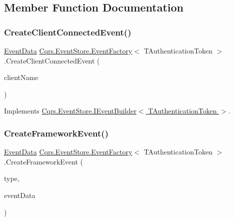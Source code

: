 \subsection{Member Function Documentation}
\mbox{\label{classCqrs_1_1EventStore_1_1EventFactory_a237daf998b545d170ab9f30187a0b8e7_a237daf998b545d170ab9f30187a0b8e7}} 
\subsubsection{\texorpdfstring{Create\+Client\+Connected\+Event()}{CreateClientConnectedEvent()}}
{\footnotesize\ttfamily \hyperlink{classCqrs_1_1Events_1_1EventData}{Event\+Data} \hyperlink{classCqrs_1_1EventStore_1_1EventFactory}{Cqrs.\+Event\+Store.\+Event\+Factory}$<$ T\+Authentication\+Token $>$.Create\+Client\+Connected\+Event (\begin{DoxyParamCaption}\item[{string}]{client\+Name }\end{DoxyParamCaption})}



Implements \hyperlink{interfaceCqrs_1_1EventStore_1_1IEventBuilder_ae11ead7fa69632041e081e60f51c4e9f_ae11ead7fa69632041e081e60f51c4e9f}{Cqrs.\+Event\+Store.\+I\+Event\+Builder$<$ T\+Authentication\+Token $>$}.

\mbox{\label{classCqrs_1_1EventStore_1_1EventFactory_a91394437675f3185d2105c6a79f7b5aa_a91394437675f3185d2105c6a79f7b5aa}} 
\subsubsection{\texorpdfstring{Create\+Framework\+Event()}{CreateFrameworkEvent()}\hspace{0.1cm}{\footnotesize\ttfamily [1/4]}}
{\footnotesize\ttfamily \hyperlink{classCqrs_1_1Events_1_1EventData}{Event\+Data} \hyperlink{classCqrs_1_1EventStore_1_1EventFactory}{Cqrs.\+Event\+Store.\+Event\+Factory}$<$ T\+Authentication\+Token $>$.Create\+Framework\+Event (\begin{DoxyParamCaption}\item[{string}]{type,  }\item[{\hyperlink{interfaceCqrs_1_1Events_1_1IEvent}{I\+Event}$<$ T\+Authentication\+Token $>$}]{event\+Data }\end{DoxyParamCaption})}



